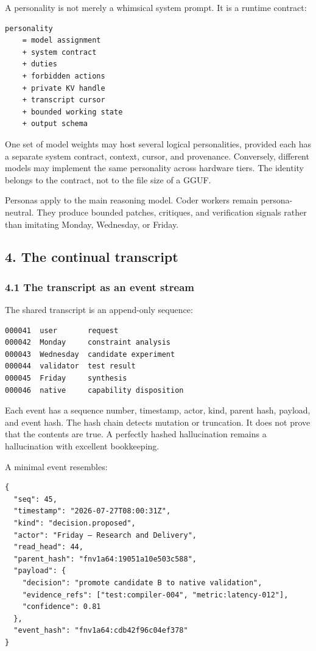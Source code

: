 A personality is not merely a whimsical system prompt. It is a runtime
contract:

\begin{verbatim}
personality
    = model assignment
    + system contract
    + duties
    + forbidden actions
    + private KV handle
    + transcript cursor
    + bounded working state
    + output schema
\end{verbatim}

One set of model weights may host several logical personalities, provided each
has a separate system contract, context, cursor, and provenance. Conversely,
different models may implement the same personality across hardware tiers. The
identity belongs to the contract, not to the file size of a GGUF.

Personas apply to the main reasoning model. Coder workers remain
persona-neutral. They produce bounded patches, critiques, and verification
signals rather than imitating Monday, Wednesday, or Friday.

\subsection{4. The continual transcript}

\subsubsection{4.1 The transcript as an event stream}

The shared transcript is an append-only sequence:

\begin{verbatim}
000041  user       request
000042  Monday     constraint analysis
000043  Wednesday  candidate experiment
000044  validator  test result
000045  Friday     synthesis
000046  native     capability disposition
\end{verbatim}

Each event has a sequence number, timestamp, actor, kind, parent hash, payload,
and event hash. The hash chain detects mutation or truncation. It does not prove
that the contents are true. A perfectly hashed hallucination remains a
hallucination with excellent bookkeeping.

A minimal event resembles:

\begin{verbatim}
{
  "seq": 45,
  "timestamp": "2026-07-27T08:00:31Z",
  "kind": "decision.proposed",
  "actor": "Friday — Research and Delivery",
  "read_head": 44,
  "parent_hash": "fnv1a64:19051a10e503c588",
  "payload": {
    "decision": "promote candidate B to native validation",
    "evidence_refs": ["test:compiler-004", "metric:latency-012"],
    "confidence": 0.81
  },
  "event_hash": "fnv1a64:cdb42f96c04ef378"
}
\end{verbatim}

